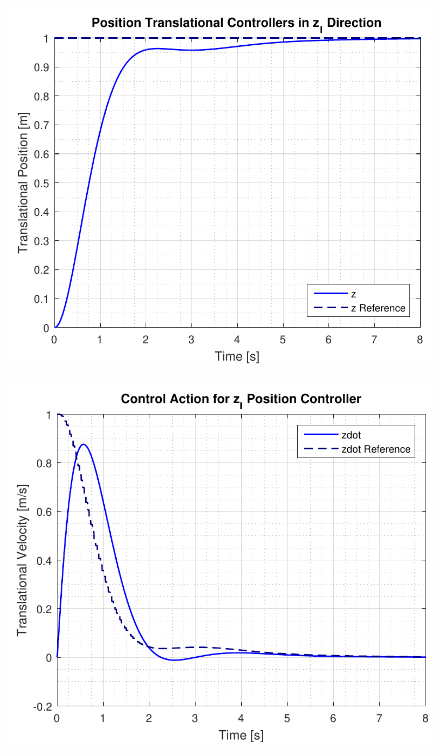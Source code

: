 \begin{minipage}{\linewidth}
    \begin{minipage}{0.45\linewidth}
        \begin{figure}[H]
            \vspace{-1.3cm}
            \includegraphics[scale=.55]{figures/positionControllerZ}
            \centering			
            \label{fig:positionControllersZ}
        \end{figure}
    \end{minipage}
    \hspace{0.03\linewidth}
    \begin{minipage}{0.45\linewidth}
        \begin{figure}[H]
            \includegraphics[scale=.55]{figures/positionControllerZAction}

\end{figure}
\end{minipage}
\end{minipage}
